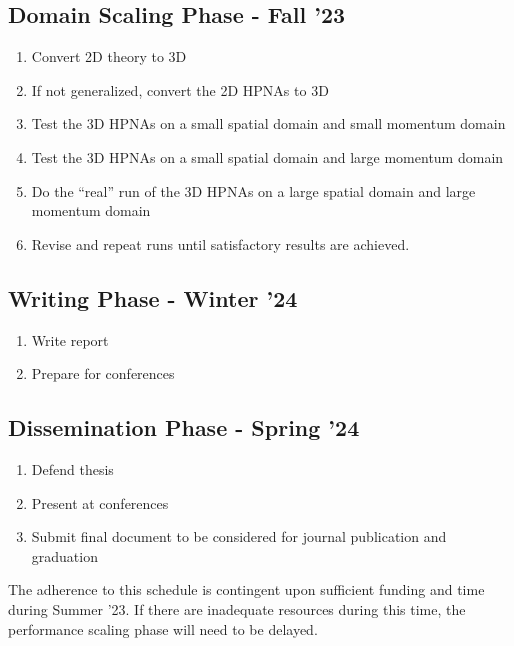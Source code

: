\documentclass{article}
\begin{document}
        \subsection{Domain Scaling Phase - Fall '23}

            \begin{enumerate}
                \item Convert 2D theory to 3D
                \item If not generalized, convert the 2D HPNAs to 3D
                \item Test the 3D HPNAs on a small spatial domain and small momentum domain
                \item Test the 3D HPNAs on a small spatial domain and large momentum domain
                \item Do the ``real'' run of the 3D HPNAs on a large spatial domain and large momentum domain
                \item Revise and repeat runs until satisfactory results are achieved.
            \end{enumerate}

        \subsection{Writing Phase - Winter '24}

            \begin{enumerate}
                \item Write report
                \item Prepare for conferences
            \end{enumerate}

        \subsection{Dissemination Phase - Spring '24}

            \begin{enumerate}
                \item Defend thesis
                \item Present at conferences
                \item Submit final document to be considered for journal publication and graduation
            \end{enumerate}

        The adherence to this schedule is contingent upon sufficient funding and time during Summer '23.  If there are inadequate resources during this time, the performance scaling phase will need to be delayed.
        
\end{document}
